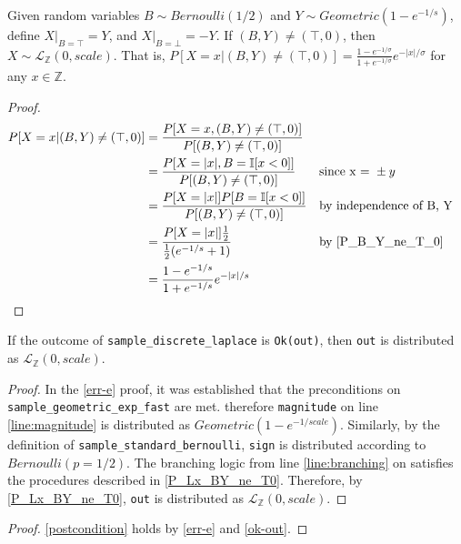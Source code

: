 \documentclass{article}
\begin{document}
\begin{lemma}\cite{CKS20}\label{P_Lx_BY_ne_T0}
    Given random variables $B \sim Bernoulli(1/2)$ and $Y \sim Geometric(1 - e^{-1/s})$, define $X|_{B=\top} = Y$, and $X|_{B=\bot} = -Y$. 
    If $(B, Y) \neq (\top, 0)$, then $X \sim \mathcal{L}_\mathbb{Z}(0, scale)$. 
    That is, $P[X = x | (B, Y) \neq (\top, 0)] = \frac{1 - e^{-1/\sigma}}{1 + e^{-1/\sigma}} e^{-|x|/\sigma}$ for any $x \in \mathbb{Z}$.
\end{lemma}

\begin{proof}
\begin{align*}
P[X = x | (B, Y) \neq (\top, 0)] &= \frac{P[X = x, (B, Y) \neq (\top, 0)]}{P[(B, Y) \neq (\top, 0)]} \\
    &= \frac{P[X = |x|, B = \mathbb{I}[x < 0]]}{P[(B, Y) \neq (\top, 0)]} && \text{since x = }\pm y \\
    &= \frac{P[X = |x|] P[B = \mathbb{I}[x < 0]]}{P[(B, Y) \neq (\top, 0)]} && \text{by independence of B, Y} \\
    &= \frac{P[X = |x|] \frac{1}{2}}{\frac{1}{2} (e^{-1/s} + 1)} && \text{by } \ref{P_B_Y_ne_T_0} \\
    &= \frac{1 - e^{-1/s}}{1 + e^{-1/s}} e^{-|x|/s} \\
\end{align*}
\end{proof}

\begin{lemma}\label{ok-out}
    If the outcome of \texttt{sample\_discrete\_laplace} is \texttt{Ok(out)}, 
    then \texttt{out} is distributed as $\mathcal{L}_\mathbb{Z}(0, scale)$.
\end{lemma}

\begin{proof}
    In the \ref{err-e} proof, it was established that the preconditions on \texttt{sample\_geometric\_exp\_fast} are met.
    therefore \texttt{magnitude} on line \ref{line:magnitude} is distributed as $ Geometric(1 - e^{-1/scale})$.
    Similarly, by the definition of \texttt{sample\_standard\_bernoulli}, \texttt{sign} is distributed according to $Bernoulli(p=1/2)$.
    The branching logic from line \ref{line:branching} on satisfies the procedures described in \ref{P_Lx_BY_ne_T0}.
    Therefore, by \ref{P_Lx_BY_ne_T0}, \texttt{out} is distributed as $\mathcal{L}_\mathbb{Z}(0, scale)$.
\end{proof}

\begin{proof}
    \ref{postcondition} holds by \ref{err-e} and \ref{ok-out}.
\end{proof}




\end{document}
